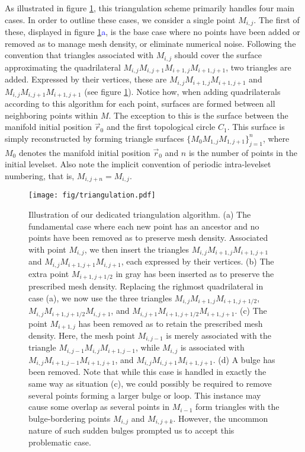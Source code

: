 As illustrated in figure \ref{fig:triangulation}, this triangulation scheme primarily  handles four main cases. In order to outline these cases, we consider a single point $M_{i,j}$. The first of these, displayed in figure \ref{fig:triangulation}\textcolor{blue}{a}, is the base case where no points have been added or removed as to manage mesh density, or eliminate numerical noise. Following the convention that triangles associated with $M_{i,j}$ should cover the surface approximating the quadrilateral $M_{i,j}M_{i,j+1}M_{i+1,j}M_{i+1,j+1}$, two triangles are added. Expressed by their vertices, these are $M_{i,j}M_{i+1,j}M_{i+1,j+1}$ and $M_{i,j}M_{i,j+1}M_{i+1,j+1}$ (see figure \ref{fig:triangulation}). Notice how, when adding quadrilaterals according to this algorithm for each point, surfaces are formed between all neighboring points within $M$. The exception to this is the surface between the manifold initial position $\vec{r}_0$ and the first topological circle $C_1$. This surface is simply reconstructed by forming triangle surfaces $\{M_0M_{1,j}M_{1,j+1}\}_{j=1}^{n}$, where $M_0$ denotes the manifold initial position $\vec{r}_0$ and $n$ is the number of points in the initial levelset. Also note the implicit convention of periodic intra-levelset numbering, that is, $M_{i,j+n}=M_{i,j}$.

\begin{figure}[h] 
\centering
\texttt{[image: fig/triangulation.pdf]}
\caption{Illustration of our dedicated triangulation algorithm. (a) The fundamental case where each new point has an ancestor and no points have been removed as to preserve mesh density. Associated with point $M_{i,j}$, we then insert the triangles  $M_{i,j}M_{i+1,j}M_{i+1,j+1}$ and $M_{i,j}M_{i+1,j+1}M_{i,j+1}$, each expressed by their vertices. (b) The extra point $M_{i+1,j+1/2}$ in gray has been inserted as to preserve the prescribed mesh density. Replacing the righmost quadrilateral in case (a), we now use the three triangles $M_{i,j}M_{i+1,j}M_{i+1,j+1/2}$, $M_{i,j}M_{i+1,j+1/2}M_{i,j+1}$, and $M_{i,j+1}M_{i+1,j+1/2}M_{i+1,j+1}$. (c) The point $M_{i+1,j}$ has been removed as to retain the prescribed mesh density. Here, the mesh point $M_{i,j-1}$ is merely associated with the triangle $M_{i,j-1}M_{i,j}M_{i+1,j-1}$, while $M_{i,j}$ is associated with $M_{i,j}M_{i+1,j-1}M_{i+1,j+1}$, and $M_{i,j}M_{i,j+1}M_{i+1,j+1}$. (d) A bulge has been removed. Note that while this case is handled in exactly the same way as situation (c), we could possibly be required to remove several points forming a larger bulge or loop. This instance may cause some overlap as several points in $M_{i-1}$ form triangles with the bulge-bordering points $M_{i,j}$ and $M_{i,j+k}$. However, the uncommon nature of such sudden bulges prompted us to accept this problematic case.}\label{fig:triangulation}
\end{figure} 

